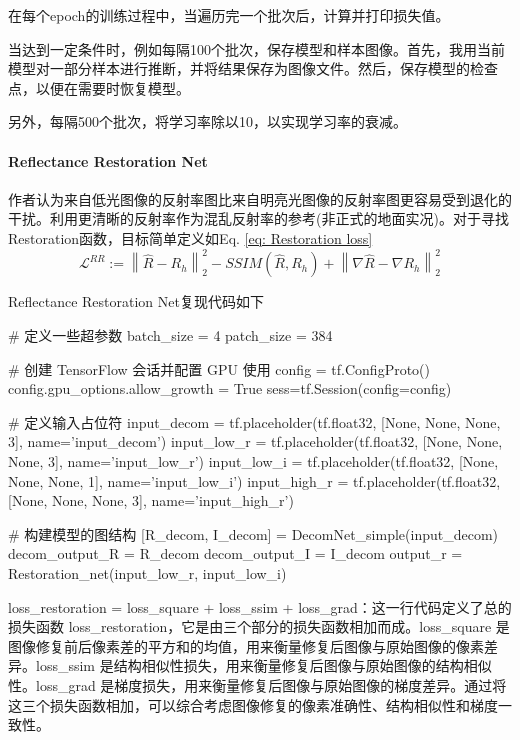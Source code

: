 \documentclass[letterpaper,12pt]{article}
\begin{document}
				在每个epoch的训练过程中，当遍历完一个批次后，计算并打印损失值。
				
				当达到一定条件时，例如每隔100个批次，保存模型和样本图像。首先，我用当前模型对一部分样本进行推断，并将结果保存为图像文件。然后，保存模型的检查点，以便在需要时恢复模型。
				
				另外，每隔500个批次，将学习率除以10，以实现学习率的衰减。
		
			\paragraph{Reflectance Restoration Net}
			
				作者认为来自低光图像的反射率图比来自明亮光图像的反射率图更容易受到退化的干扰。利用更清晰的反射率作为混乱反射率的参考(非正式的地面实况)。对于寻找Restoration函数，目标简单定义如Eq. \ref{eq: Restoration loss}
				\begin{equation}
					\mathcal{L}^{RR}:={\left\| \hat{R}-R_{h} \right\|}^{2}_{2} - SSIM(\hat{R},R_{h}) + {\left\|\nabla\hat{R}-\nabla R_{h} \right\|}^{2}_{2}
					\label{eq: Restoration loss}
				\end{equation}
				
				Reflectance Restoration Net复现代码如下
				
				\begin{python}
				# 定义一些超参数
				batch_size = 4
				patch_size = 384
					
				# 创建 TensorFlow 会话并配置 GPU 使用
				config = tf.ConfigProto()
				config.gpu_options.allow_growth = True
				sess=tf.Session(config=config)
					
				# 定义输入占位符
				input_decom = tf.placeholder(tf.float32, [None, None, None, 3], name='input_decom')
				input_low_r = tf.placeholder(tf.float32, [None, None, None, 3], name='input_low_r')
				input_low_i = tf.placeholder(tf.float32, [None, None, None, 1], name='input_low_i')
				input_high_r = tf.placeholder(tf.float32, [None, None, None, 3], name='input_high_r')
					
				# 构建模型的图结构
				[R_decom, I_decom] = DecomNet_simple(input_decom)
				decom_output_R = R_decom
				decom_output_I = I_decom
				output_r = Restoration_net(input_low_r, input_low_i)
				\end{python}
				
				loss\_restoration = loss\_square + loss\_ssim + loss\_grad：这一行代码定义了总的损失函数 loss\_restoration，它是由三个部分的损失函数相加而成。loss\_square 是图像修复前后像素差的平方和的均值，用来衡量修复后图像与原始图像的像素差异。loss\_ssim 是结构相似性损失，用来衡量修复后图像与原始图像的结构相似性。loss\_grad 是梯度损失，用来衡量修复后图像与原始图像的梯度差异。通过将这三个损失函数相加，可以综合考虑图像修复的像素准确性、结构相似性和梯度一致性。
				
\end{document}
